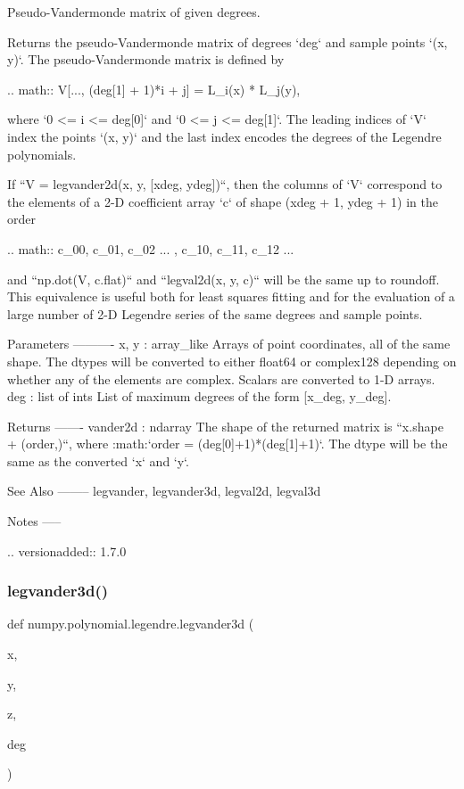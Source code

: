 \begin{DoxyVerb}Pseudo-Vandermonde matrix of given degrees.

Returns the pseudo-Vandermonde matrix of degrees `deg` and sample
points `(x, y)`. The pseudo-Vandermonde matrix is defined by

.. math:: V[..., (deg[1] + 1)*i + j] = L_i(x) * L_j(y),

where `0 <= i <= deg[0]` and `0 <= j <= deg[1]`. The leading indices of
`V` index the points `(x, y)` and the last index encodes the degrees of
the Legendre polynomials.

If ``V = legvander2d(x, y, [xdeg, ydeg])``, then the columns of `V`
correspond to the elements of a 2-D coefficient array `c` of shape
(xdeg + 1, ydeg + 1) in the order

.. math:: c_{00}, c_{01}, c_{02} ... , c_{10}, c_{11}, c_{12} ...

and ``np.dot(V, c.flat)`` and ``legval2d(x, y, c)`` will be the same
up to roundoff. This equivalence is useful both for least squares
fitting and for the evaluation of a large number of 2-D Legendre
series of the same degrees and sample points.

Parameters
----------
x, y : array_like
    Arrays of point coordinates, all of the same shape. The dtypes
    will be converted to either float64 or complex128 depending on
    whether any of the elements are complex. Scalars are converted to
    1-D arrays.
deg : list of ints
    List of maximum degrees of the form [x_deg, y_deg].

Returns
-------
vander2d : ndarray
    The shape of the returned matrix is ``x.shape + (order,)``, where
    :math:`order = (deg[0]+1)*(deg[1]+1)`.  The dtype will be the same
    as the converted `x` and `y`.

See Also
--------
legvander, legvander3d, legval2d, legval3d

Notes
-----

.. versionadded:: 1.7.0\end{DoxyVerb}
 \mbox{\label{namespacenumpy_1_1polynomial_1_1legendre_a64d316b84919ca312b0f225e9c521c54}} 
\subsubsection{\texorpdfstring{legvander3d()}{legvander3d()}}
{\footnotesize\ttfamily def numpy.\+polynomial.\+legendre.\+legvander3d (\begin{DoxyParamCaption}\item[{}]{x,  }\item[{}]{y,  }\item[{}]{z,  }\item[{}]{deg }\end{DoxyParamCaption})}

